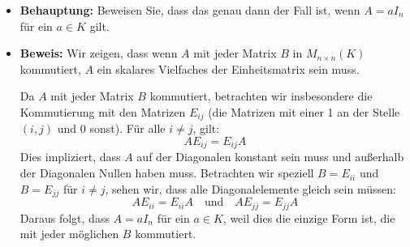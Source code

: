 \begin{itemize}
    \item \textbf{Behauptung:}
    Beweisen Sie, dass das genau dann der Fall ist, wenn \( A = aI_n \) für ein \( a \in K \) gilt.
    
    \item \textbf{Beweis:}
    Wir zeigen, dass wenn \( A \) mit jeder Matrix \( B \) in \( M_{n \times n}(K) \) kommutiert, \( A \) ein skalares Vielfaches der Einheitsmatrix sein muss.

    Da \( A \) mit jeder Matrix \( B \) kommutiert, betrachten wir insbesondere die Kommutierung mit den Matrizen \( E_{ij} \) (die Matrizen mit einer 1 an der Stelle \( (i, j) \) und 0 sonst). Für alle \( i \neq j \), gilt:
    \[
    AE_{ij} = E_{ij}A
    \]
    Dies impliziert, dass \( A \) auf der Diagonalen konstant sein muss und außerhalb der Diagonalen Nullen haben muss. Betrachten wir speziell \( B = E_{ii} \) und \( B = E_{jj} \) für \( i \neq j \), sehen wir, dass alle Diagonalelemente gleich sein müssen:
    \[
    AE_{ii} = E_{ii}A \quad \text{und} \quad AE_{jj} = E_{jj}A
    \]
    Daraus folgt, dass \( A = aI_n \) für ein \( a \in K \), weil dies die einzige Form ist, die mit jeder möglichen \( B \) kommutiert.
\end{itemize}